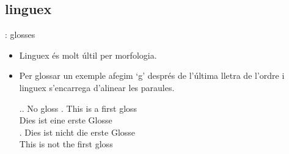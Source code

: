 \subsection{linguex}
\begin{frame}[fragile]{\insertsubsection{}: glosses}
\begin{itemize}
\item Linguex és molt últil per morfologia. 
\item Per glossar un exemple afegim `g' després de l'última lletra de l'ordre i linguex s'encarrega d'alinear les paraules.
\begin{exampletwouptiny2}
\ex.\a. No gloss
\bg. This is a first gloss\\
Dies ist eine erste Glosse\\

\exg.
Dies ist nicht die erste Glosse\\
This is not the first gloss\\

\end{exampletwouptiny2}
\end{itemize}

\end{frame}
